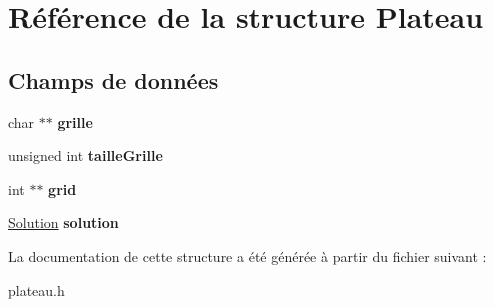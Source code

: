 \hypertarget{structPlateau}{\section{Référence de la structure Plateau}
\label{structPlateau}
}
\subsection*{Champs de données}
\begin{DoxyCompactItemize}
\item 
\hypertarget{structPlateau_a42411aa44b78d298681030ce3461f686}{char $\ast$$\ast$ {\bfseries grille}}\label{structPlateau_a42411aa44b78d298681030ce3461f686}

\item 
\hypertarget{structPlateau_aa71d603afaf91ff7c81427af61919a34}{unsigned int {\bfseries taille\-Grille}}\label{structPlateau_aa71d603afaf91ff7c81427af61919a34}

\item 
\hypertarget{structPlateau_aeb94d618db5af1b25a4f64042a4ad771}{int $\ast$$\ast$ {\bfseries grid}}\label{structPlateau_aeb94d618db5af1b25a4f64042a4ad771}

\item 
\hypertarget{structPlateau_aed88af50891b17edcd3ba97d7098dfde}{\hyperlink{structSolution}{Solution} {\bfseries solution}}\label{structPlateau_aed88af50891b17edcd3ba97d7098dfde}

\end{DoxyCompactItemize}


La documentation de cette structure a été générée à partir du fichier suivant \-:\begin{DoxyCompactItemize}
\item 
plateau.\-h\end{DoxyCompactItemize}
